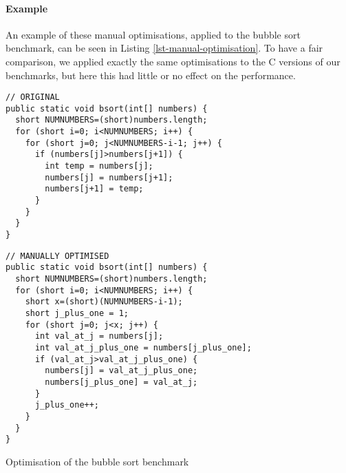 \paragraph{Example} An example of these manual optimisations, applied to the bubble sort benchmark, can be seen in Listing \ref{lst-manual-optimisation}. To have a fair comparison, we applied exactly the same optimisations to the C versions of our benchmarks, but here this had little or no effect on the performance.

\begin{listing}[H]
 \centering
 \begin{minipage}[t]{0.45\textwidth}
  \centering
  \begin{verbatim}
// ORIGINAL
public static void bsort(int[] numbers) {
  short NUMNUMBERS=(short)numbers.length;
  for (short i=0; i<NUMNUMBERS; i++) {
    for (short j=0; j<NUMNUMBERS-i-1; j++) {
      if (numbers[j]>numbers[j+1]) {
        int temp = numbers[j];
        numbers[j] = numbers[j+1];
        numbers[j+1] = temp;
      }
    }
  }
}
  \end{verbatim}
 \end{minipage}\hfill
 \begin{minipage}[t]{0.45\textwidth}
  \centering
  \begin{verbatim}
// MANUALLY OPTIMISED
public static void bsort(int[] numbers) {
  short NUMNUMBERS=(short)numbers.length;
  for (short i=0; i<NUMNUMBERS; i++) {
    short x=(short)(NUMNUMBERS-i-1);
    short j_plus_one = 1;
    for (short j=0; j<x; j++) {
      int val_at_j = numbers[j];
      int val_at_j_plus_one = numbers[j_plus_one];
      if (val_at_j>val_at_j_plus_one) {
        numbers[j] = val_at_j_plus_one;
        numbers[j_plus_one] = val_at_j;
      }
      j_plus_one++;
    }
  }
}
  \end{verbatim}
 \end{minipage}
\caption{Optimisation of the bubble sort benchmark}
\label{lst-manual-optimisation}
\end{listing}


